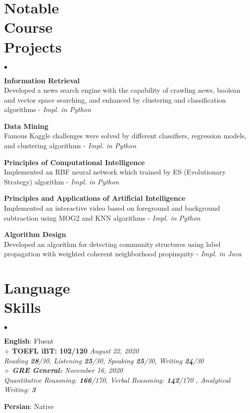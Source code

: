 \documentclass[margin,line]{res}
\newenvironment{list2}{
\begin{list}{$\bullet$}{
		\setlength{\itemsep}{0in}
		\setlength{\parsep}{0in} \setlength{\parskip}{0in}
		\setlength{\topsep}{0in} \setlength{\partopsep}{0in} 
		\setlength{\leftmargin}{0.2in}}}{\end{list}}
\begin{document}
\begin{resume}
	\section{\sc Notable \\ Course \\ Projects}
	\begin{list2}
		\item \textbf{Information Retrieval} \\
		Developed a news search engine with the capability of crawling news, boolean and vector space searching, and enhanced by clustering and classification algorithms - \textit{Impl. in Python}
		\item \textbf{Data Mining} \\
		Famous Kaggle challenges were solved by different classifiers, regression models, and clustering algorithms - \textit{Impl. in Python}
		\item \textbf{Principles of Computational Intelligence} \\
		Implemented an RBF neural network which trained by ES (Evolutionary Strategy) algorithm - \textit{Impl. in Python}
		\item \textbf{Principles and Applications of Artificial Intelligence} \\
		Implemented an interactive video based on foreground and background subtraction using MOG2 and KNN algorithms - \textit{Impl. in Python}
		\item \textbf{Algorithm Design} \\
		Developed an algorithm for detecting community structures using label propagation with weighted coherent neighborhood propinquity - \textit{Impl. in Java}
	\end{list2}
	
	\section{\sc Language \\ Skills} 
	\begin{list2}
		\item \textbf{English}: Fluent \\
		$\diamond$ \textbf{TOEFL iBT: 102/120} \hfill \sl{\textit{August 22, 2020}} \\
		\textit{Reading \textbf{28}/30, Listening \textbf{25}/30, Speaking \textbf{25}/30, Writing \textbf{24}/30} \\
		$\diamond$ \textbf{GRE General:} \hfill \sl{\textit{November 16, 2020}} \\
		\textit{Quantitative Reasoning: \textbf{166}/170, Verbal Reasoning: \textbf{142}/170 , Analytical Writing: \textbf{3}} \\
		\vspace{-0.3cm}
		\item \textbf{Persian}: Native
	\end{list2}

\end{resume}
\end{document}
